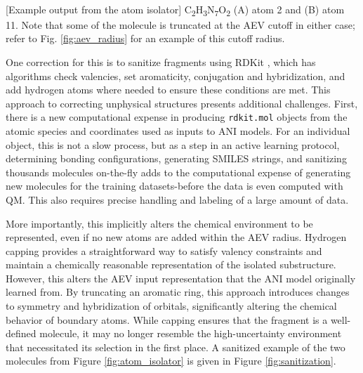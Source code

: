 \begin{flushleft}
\begin{multiFigure}
\begin{centering}
     \\
[Example output from the atom isolator]{
C\textsubscript{2}H\textsubscript{3}N\textsubscript{7}O\textsubscript{2} (A) atom 2 and (B) atom 11. Note that some of the molecule is truncated at the AEV cutoff in either case; refer to Fig. \ref{fig:aev_radius} for an example of this cutoff radius.
}
\label{fig:atom_isolator}
\end{centering}
\end{multiFigure}
\end{flushleft}


One correction for this is to sanitize fragments using RDKit \cite{rdkit}, which has algorithms check valencies, set aromaticity, conjugation and hybridization, and add hydrogen atoms where needed to ensure these conditions are met.
This approach to correcting unphysical structures presents additional challenges. 
First, there is a new computational expense in producing \verb|rdkit.mol| objects from the atomic species and coordinates used as inputs to ANI models.
For an individual object, this is not a slow process, but as a step in an active learning protocol, determining bonding configurations, generating SMILES strings, and sanitizing thousands molecules on-the-fly adds to the computational expense of generating new molecules for the training datasets-before the data is even computed with QM.
This also requires precise handling and labeling of a large amount of data.

More importantly, this implicitly alters the chemical environment to be represented, even if no new atoms are added within the AEV radius.
Hydrogen capping provides a straightforward way to satisfy valency constraints and maintain a chemically reasonable representation of the isolated substructure. 
However, this alters the AEV input representation that the ANI model originally learned from.
By truncating an aromatic ring, this approach introduces changes to symmetry and hybridization of orbitals, significantly altering the chemical behavior of boundary atoms.
While capping ensures that the fragment is a well-defined molecule, it may no longer resemble the high-uncertainty environment that necessitated its selection in the first place. 
A sanitized example of the two molecules from Figure \ref{fig:atom_isolator} is given in Figure \ref{fig:sanitization}.

